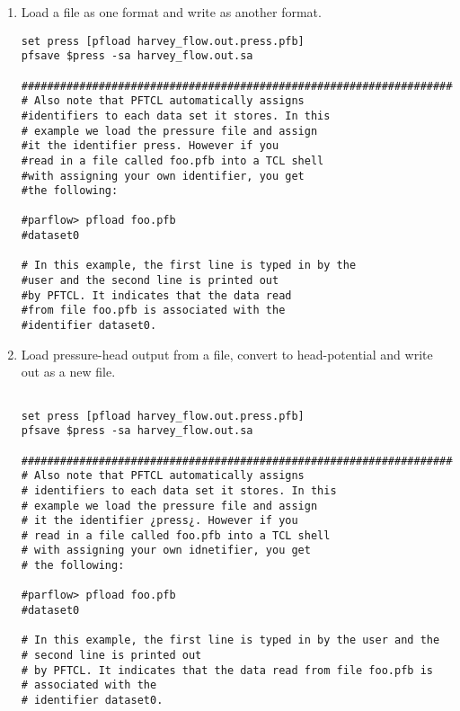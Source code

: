 \begin{enumerate}

\item Load a file as one format and write as another format.
\begin{display}\begin{verbatim}
set press [pfload harvey_flow.out.press.pfb]
pfsave $press -sa harvey_flow.out.sa

#####################################################################
# Also note that PFTCL automatically assigns 
#identifiers to each data set it stores. In this 
# example we load the pressure file and assign 
#it the identifier press. However if you  
#read in a file called foo.pfb into a TCL shell 
#with assigning your own identifier, you get 
#the following:

#parflow> pfload foo.pfb
#dataset0

# In this example, the first line is typed in by the
#user and the second line is printed out 
#by PFTCL. It indicates that the data read 
#from file foo.pfb is associated with the 
#identifier dataset0.

\end{verbatim}\end{display}


\item Load pressure-head output from a file, convert to head-potential and write out as a new file.

\begin{display}\begin{verbatim}

set press [pfload harvey_flow.out.press.pfb]
pfsave $press -sa harvey_flow.out.sa

#####################################################################
# Also note that PFTCL automatically assigns
# identifiers to each data set it stores. In this 
# example we load the pressure file and assign 
# it the identifier ¿press¿. However if you  
# read in a file called foo.pfb into a TCL shell 
# with assigning your own idnetifier, you get 
# the following:

#parflow> pfload foo.pfb
#dataset0

# In this example, the first line is typed in by the user and the 
# second line is printed out 
# by PFTCL. It indicates that the data read from file foo.pfb is 
# associated with the 
# identifier dataset0.

\end{verbatim}\end{display}




\end{enumerate}
